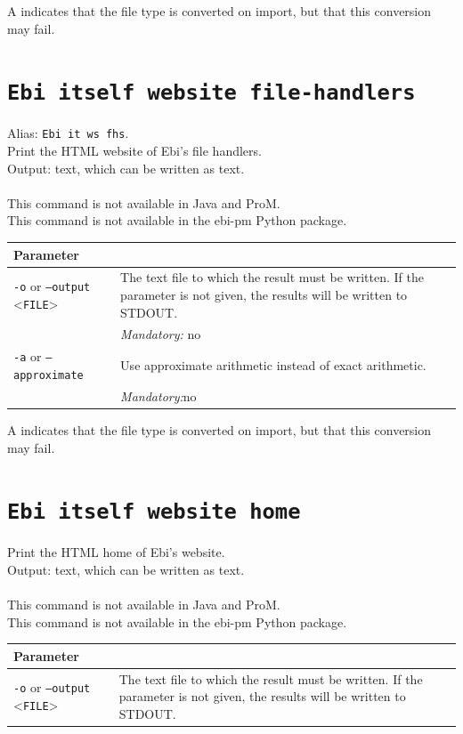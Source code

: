 {\begin{tabularx}{\linewidth}{lX}
\bottomrule
\end{tabularx}
A \textdagger{} indicates that the file type is converted on import, but that this conversion may fail.
\clearpage\section{\texttt{Ebi itself website file-handlers}}
\label{command:Ebi itself website file-handlers}
Alias: \texttt{Ebi it ws fhs}.\\
Print the HTML website of Ebi's file handlers.\\
\noindent Output: text, which can be written as  text.\\
\\This command is not available in Java and ProM.
\\This command is not available in the ebi-pm Python package.
\begin{tabularx}{\linewidth}{lX}
\toprule
Parameter \\\midrule
\texttt{-o} or \texttt{--output} <\texttt{FILE}> &
The text file to which the result must be written. If the parameter is not given, the results will be written to STDOUT.\\
&\textit{Mandatory:} \quad no\\
\texttt{-a} or \texttt{--approximate} & Use approximate arithmetic instead of exact arithmetic.\\
&\textit{Mandatory:}\quad no\\
\bottomrule
\end{tabularx}
A \textdagger{} indicates that the file type is converted on import, but that this conversion may fail.
\clearpage\section{\texttt{Ebi itself website home}}
\label{command:Ebi itself website home}
Print the HTML home of Ebi's website.\\
\noindent Output: text, which can be written as  text.\\
\\This command is not available in Java and ProM.
\\This command is not available in the ebi-pm Python package.
\begin{tabularx}{\linewidth}{lX}
\toprule
Parameter \\\midrule
\texttt{-o} or \texttt{--output} <\texttt{FILE}> &
The text file to which the result must be written. If the parameter is not given, the results will be written to STDOUT.\\

\end{tabularx}}
